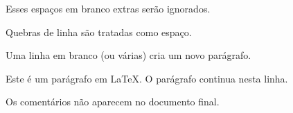\documentclass[a4paper]{article}
\begin{document}
Esses   espaços   em    branco  extras    serão ignorados.

Quebras de
linha são tratadas como
espaço.


Uma linha em branco (ou várias) cria um novo parágrafo.

\clearpage

Este é um parágrafo em \LaTeX. %
O parágrafo continua nesta linha.


Os comentários não aparecem no documento final.
\end{document}
